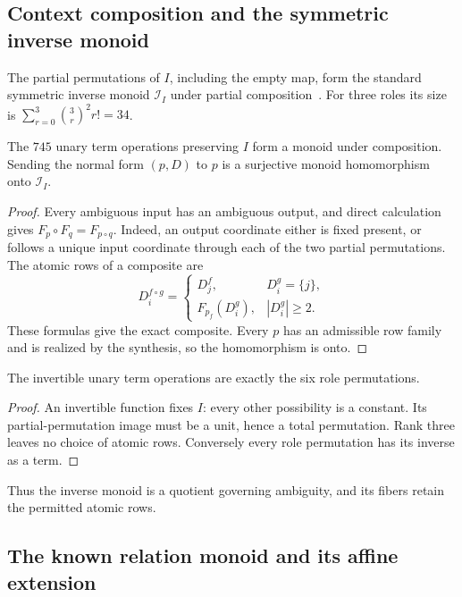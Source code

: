 \subsection{Context composition and the symmetric inverse monoid}

The partial permutations of $I$, including the empty map, form the
standard symmetric inverse monoid $\mathcal I_I$ under partial
composition~\cite{East2006}. For three roles its size is
$\sum_{r=0}^3\binom3r^2r!=34$.

\begin{proposition}\label{sym:thm:monoid}
The $745$ unary term operations preserving $I$ form a monoid under
composition. Sending the normal form $(p,D)$ to $p$ is a surjective
monoid homomorphism onto $\mathcal I_I$.
\end{proposition}
\begin{proof}
Every ambiguous input has an ambiguous output, and direct calculation
gives $F_p\circ F_q=F_{p\circ q}$. Indeed, an output coordinate either
is fixed present, or follows a unique input coordinate through each of
the two partial permutations. The atomic rows of a composite are
\[
 D^{f\circ g}_i=\begin{cases}
 D^f_j,&D^g_i=\{j\},\\
 F_{p_f}(D^g_i),&|D^g_i|\geq2.
 \end{cases}
\]
These formulas give the exact composite. Every $p$ has an admissible row
family and is realized by the synthesis, so the homomorphism is onto.
\end{proof}

\begin{corollary}
The invertible unary term operations are exactly the six role
permutations.
\end{corollary}
\begin{proof}
An invertible function fixes $I$: every other possibility is a constant.
Its partial-permutation image must be a unit, hence a total permutation.
Rank three leaves no choice of atomic rows. Conversely every role
permutation has its inverse as a term.
\end{proof}

Thus the inverse monoid is a quotient governing ambiguity, and its fibers retain the permitted atomic rows.

\subsection{The known relation monoid and its affine extension}


